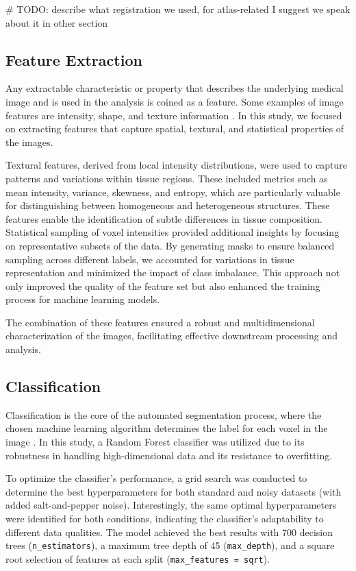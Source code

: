 \# TODO: describe what registration we used, for atlas-related I suggest we speak about it in other section

\subsection{Feature Extraction}

Any extractable characteristic or property that describes the underlying medical image and is used in the analysis is coined as a feature. Some examples of image features are intensity, shape, and texture information \cite{b8}. In this study, we focused on extracting features that capture spatial, textural, and statistical properties of the images.

Textural features, derived from local intensity distributions, were used to capture patterns and variations within tissue regions. These included metrics such as mean intensity, variance, skewness, and entropy, which are particularly valuable for distinguishing between homogeneous and heterogeneous structures. These features enable the identification of subtle differences in tissue composition. Statistical sampling of voxel intensities provided additional insights by focusing on representative subsets of the data. By generating masks to ensure balanced sampling across different labels, we accounted for variations in tissue representation and minimized the impact of class imbalance. This approach not only improved the quality of the feature set but also enhanced the training process for machine learning models.

The combination of these features ensured a robust and multidimensional characterization of the images, facilitating effective downstream processing and analysis.

\subsection{Classification}

Classification is the core of the automated segmentation process, where the chosen machine learning algorithm determines the label for each voxel in the image \cite{b8}. In this study, a Random Forest classifier was utilized due to its robustness in handling high-dimensional data and its resistance to overfitting.

To optimize the classifier’s performance, a grid search was conducted to determine the best hyperparameters for both standard and noisy datasets (with added salt-and-pepper noise). Interestingly, the same optimal hyperparameters were identified for both conditions, indicating the classifier’s adaptability to different data qualities. The model achieved the best results with 700 decision trees (\texttt{n\_estimators}), a maximum tree depth of 45 (\texttt{max\_depth}), and a square root selection of features at each split (\texttt{max\_features = sqrt}).

